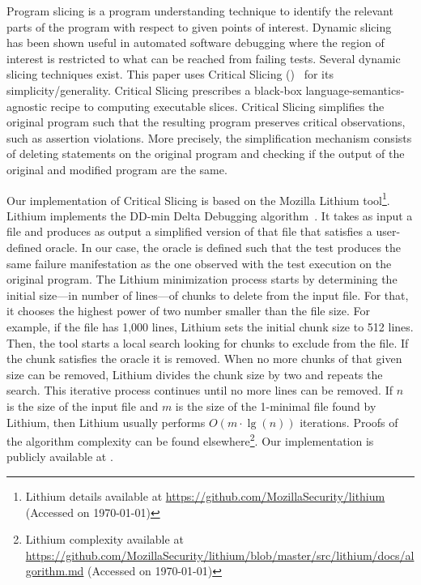 \documentclass{article}
\begin{document}
Program slicing is a program understanding technique to identify the
relevant parts of the program with respect to given points of
interest.  Dynamic
slicing~\cite{Agrawal:1990:DPS:93542.93576}
has been shown useful in automated software debugging where the region
of interest is restricted to what can be reached from failing
tests. Several dynamic slicing techniques exist. This paper uses
Critical Slicing (\cs{})~\cite{DeMillo:1996:CSS:229000.226310} for its
simplicity/generality. Critical Slicing
prescribes a black-box language-semantics-agnostic recipe to computing
executable slices.  Critical Slicing simplifies the original
program such that the resulting program preserves critical
observations, such as assertion violations. More precisely, the
simplification mechanism consists of deleting statements on the
original program and checking if the output of the original and
modified program are the same.

Our implementation of Critical Slicing is based on the Mozilla Lithium
tool\footnote{Lithium details available at \url{https://github.com/MozillaSecurity/lithium} (Accessed on \today)}. Lithium implements the DD-min Delta Debugging
algorithm~\cite{zeller-hildebrandt-tse2002}. It takes as input a file
and produces as output a simplified version of that file that
satisfies a user-defined oracle. In our case, the oracle is defined
such that the test produces the same failure manifestation as the one
observed with the test execution on the original program. The
Lithium minimization process starts by determining the initial size---in number of lines---of
chunks to delete from the input file. For that,
it chooses the highest power of two number smaller than the file
size. For example, if the file has 1,000 lines, Lithium sets the
initial chunk size to 512 lines. Then, the tool starts a local search looking
for chunks to exclude from the file. If the chunk satisfies the oracle it is removed.
When no more chunks of that given size can be removed, Lithium
divides the chunk size by two and repeats the search. This iterative
process continues until no more lines can be removed.  If $n$ is the
size of the input file and $m$ is the size of the 1-minimal file found
by Lithium, then Lithium usually performs $O(m\cdot\lg(n))$
iterations. Proofs of the algorithm complexity can be found
elsewhere\footnote{Lithium complexity available at \url{https://github.com/MozillaSecurity/lithium/blob/master/src/lithium/docs/algorithm.md} (Accessed on \today)}. Our implementation is publicly
available at .
\end{document}
